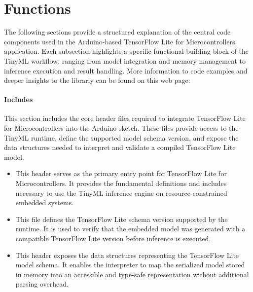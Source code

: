 \section{Functions}\label{FunctionsTensorFlow}

The following sections provide a structured explanation of the central code components used in the Arduino-based TensorFlow Lite for Microcontrollers application. Each subsection highlights a specific functional building block of the TinyML workflow, ranging from model integration and memory management to inference execution and result handling. More information to code examples and deeper insights to the librariy can be found on this web page: 


\paragraph{Includes}

This section includes the core header files required to integrate TensorFlow Lite for Microcontrollers into the Arduino sketch. These files provide access to the TinyML runtime, define the supported model schema version, and expose the data structures needed to interpret and validate a compiled TensorFlow Lite model.

\begin{itemize}
	\item {} 
	
	This header serves as the primary entry point for TensorFlow Lite for Microcontrollers. It provides the fundamental definitions and includes necessary to use the TinyML inference engine on resource-constrained embedded systems.
	
	\item {} 
	
	This file defines the TensorFlow Lite schema version supported by the runtime. It is used to verify that the embedded model was generated with a compatible TensorFlow Lite version before inference is executed.
	
	\item {} 
	
	This header exposes the data structures representing the TensorFlow Lite model schema. It enables the interpreter to map the serialized model stored in memory into an accessible and type-safe representation without additional parsing overhead.
\end{itemize}


